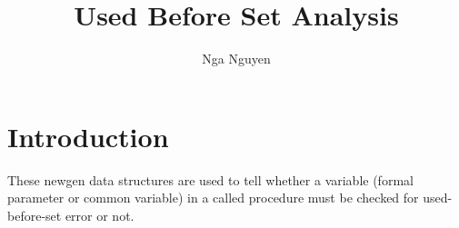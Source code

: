 \documentclass[a4paper]{article}
\title{Used Before Set Analysis}
\author{Nga Nguyen}
\begin{document}
\maketitle

\section{Introduction}

These newgen data structures are used to tell whether a variable
(formal parameter or common variable) in a called procedure must be
checked for used-before-set error or not.

{}

{}
{}
\end{document}
